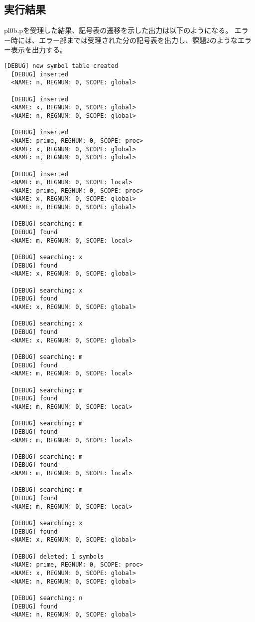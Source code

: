 \subsection{実行結果}
pl0b.pを受理した結果、記号表の遷移を示した出力は以下のようになる。
エラー時には、エラー部までは受理された分の記号表を出力し、課題2のようなエラー表示を出力する。
\begin{lstlisting}[caption={./parser pl0b.pの実行結果},label={./parser pl0b.pの実行結果}]
  [DEBUG] new symbol table created
  [DEBUG] inserted
  <NAME: n, REGNUM: 0, SCOPE: global>
  
  [DEBUG] inserted
  <NAME: x, REGNUM: 0, SCOPE: global>
  <NAME: n, REGNUM: 0, SCOPE: global>
  
  [DEBUG] inserted
  <NAME: prime, REGNUM: 0, SCOPE: proc>
  <NAME: x, REGNUM: 0, SCOPE: global>
  <NAME: n, REGNUM: 0, SCOPE: global>
  
  [DEBUG] inserted
  <NAME: m, REGNUM: 0, SCOPE: local>
  <NAME: prime, REGNUM: 0, SCOPE: proc>
  <NAME: x, REGNUM: 0, SCOPE: global>
  <NAME: n, REGNUM: 0, SCOPE: global>
  
  [DEBUG] searching: m
  [DEBUG] found
  <NAME: m, REGNUM: 0, SCOPE: local>
  
  [DEBUG] searching: x
  [DEBUG] found
  <NAME: x, REGNUM: 0, SCOPE: global>
  
  [DEBUG] searching: x
  [DEBUG] found
  <NAME: x, REGNUM: 0, SCOPE: global>
  
  [DEBUG] searching: x
  [DEBUG] found
  <NAME: x, REGNUM: 0, SCOPE: global>
  
  [DEBUG] searching: m
  [DEBUG] found
  <NAME: m, REGNUM: 0, SCOPE: local>
  
  [DEBUG] searching: m
  [DEBUG] found
  <NAME: m, REGNUM: 0, SCOPE: local>
  
  [DEBUG] searching: m
  [DEBUG] found
  <NAME: m, REGNUM: 0, SCOPE: local>
  
  [DEBUG] searching: m
  [DEBUG] found
  <NAME: m, REGNUM: 0, SCOPE: local>
  
  [DEBUG] searching: m
  [DEBUG] found
  <NAME: m, REGNUM: 0, SCOPE: local>
  
  [DEBUG] searching: x
  [DEBUG] found
  <NAME: x, REGNUM: 0, SCOPE: global>
  
  [DEBUG] deleted: 1 symbols
  <NAME: prime, REGNUM: 0, SCOPE: proc>
  <NAME: x, REGNUM: 0, SCOPE: global>
  <NAME: n, REGNUM: 0, SCOPE: global>
  
  [DEBUG] searching: n
  [DEBUG] found
  <NAME: n, REGNUM: 0, SCOPE: global>
  

\end{lstlisting}
